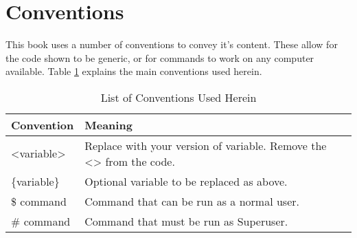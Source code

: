 \documentclass[twoside,a6paper,11pt]{report}
\begin{document}
	\section{Conventions}
		This book uses a number of conventions to convey it's content. 
		These allow for the code shown to be generic, or for commands to work on any computer available. 
		Table \ref{tab:BookConventions} explains the main conventions used herein. 
		\begin{table}[htb]
			\centering
			\begin{tabular}{|l|p{7cm}|}
				\hline
				\textbf{Convention} & \textbf{Meaning} \\ \hline
				<variable> & Replace with your version of variable. 
								Remove the <> from the code. \\ \hline
				\{variable\} & Optional variable to be replaced as above. \\ \hline
				\$ command & Command that can be run as a normal user. \\ \hline
				\# command & Command that must be run as Superuser. \\ \hline
			\end{tabular}
			\caption{List of Conventions Used Herein}
			\label{tab:BookConventions}
		\end{table}
\mainmatter















\appendix
	\label{ch:Appendix}
	
	
\end{document}
